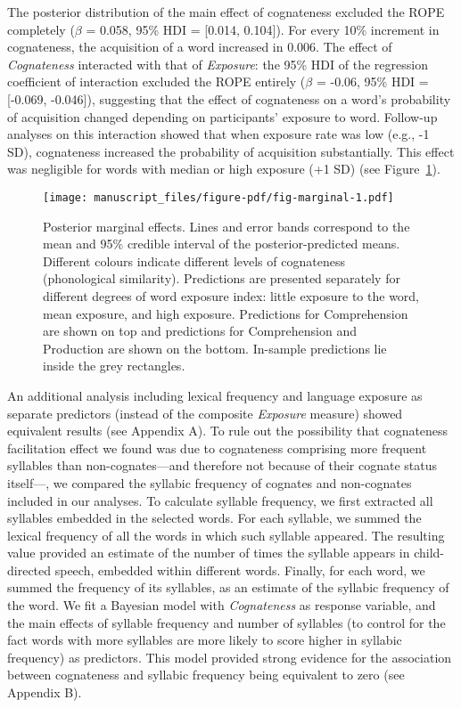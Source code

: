 \documentclass[
]{article}
\begin{document}
The posterior distribution of the main effect of cognateness excluded
the ROPE completely (\(\beta\) = 0.058, 95\% HDI = {[}0.014, 0.104{]}).
For every 10\% increment in cognateness, the acquisition of a word
increased in 0.006. The effect of \emph{Cognateness} interacted with
that of \emph{Exposure}: the 95\% HDI of the regression coefficient of
interaction excluded the ROPE entirely (\(\beta\) = -0.06, 95\% HDI =
{[}-0.069, -0.046{]}), suggesting that the effect of cognateness on a
word's probability of acquisition changed depending on participants'
exposure to word. Follow-up analyses on this interaction showed that
when exposure rate was low (e.g., -1 SD), cognateness increased the
probability of acquisition substantially. This effect was negligible for
words with median or high exposure (+1 SD) (see
Figure~\ref{fig-marginal}).

\begin{figure}

{\centering \texttt{[image: manuscript\_files/figure-pdf/fig-marginal-1.pdf]}

}

\caption{\label{fig-marginal}Posterior marginal effects. Lines and error
bands correspond to the mean and 95\% credible interval of the
posterior-predicted means. Different colours indicate different levels
of cognateness (phonological similarity). Predictions are presented
separately for different degrees of word exposure index: little exposure
to the word, mean exposure, and high exposure. Predictions for
Comprehension are shown on top and predictions for Comprehension and
Production are shown on the bottom. In-sample predictions lie inside the
grey rectangles.}

\end{figure}

An additional analysis including lexical frequency and language exposure
as separate predictors (instead of the composite \emph{Exposure}
measure) showed equivalent results (see Appendix A). To rule out the
possibility that cognateness facilitation effect we found was due to
cognateness comprising more frequent syllables than non-cognates---and
therefore not because of their cognate status itself---, we compared the
syllabic frequency of cognates and non-cognates included in our
analyses. To calculate syllable frequency, we first extracted all
syllables embedded in the selected words. For each syllable, we summed
the lexical frequency of all the words in which such syllable appeared.
The resulting value provided an estimate of the number of times the
syllable appears in child-directed speech, embedded within different
words. Finally, for each word, we summed the frequency of its syllables,
as an estimate of the syllabic frequency of the word. We fit a Bayesian
model with \emph{Cognateness} as response variable, and the main effects
of syllable frequency and number of syllables (to control for the fact
words with more syllables are more likely to score higher in syllabic
frequency) as predictors. This model provided strong evidence for the
association between cognateness and syllabic frequency being equivalent
to zero (see Appendix B).
\end{document}
